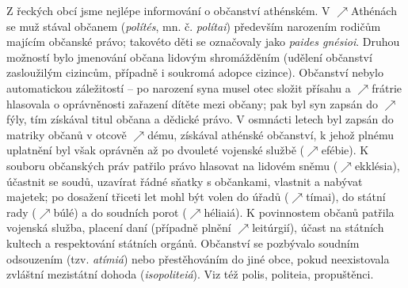 \documentclass{article}
\begin{document}
  Z řeckých obcí jsme nejlépe informování o občanství athénském. V $\nearrow$Athénách se muž stával občanem ({\it polítés}, mn. č. {\it polítai}) především narozením rodičům majícím občanské právo; takovéto děti se označovaly jako {\it paides gnésioi}. Druhou možností bylo jmenování občana lidovým shromážděním (udělení občanství zasloužilým cizincům, případně i soukromá adopce cizince). Občanství nebylo automatickou záležitostí -- po narození syna musel otec složit přísahu a $\nearrow$frátrie hlasovala o oprávněnosti zařazení dítěte mezi občany; pak byl syn zapsán do $\nearrow$fýly, tím získával titul občana a dědické právo. V osmnácti letech byl zapsán do matriky občanů v otcově $\nearrow$dému, získával athénské občanství, k jehož plnému uplatnění byl však oprávněn až po dvouleté vojenské službě ($\nearrow$efébie). K souboru občanských práv patřilo právo hlasovat na lidovém sněmu ($\nearrow$ekklésia), účastnit se soudů, uzavírat řádné sňatky s občankami, vlastnit a nabývat majetek; po dosažení třiceti let mohl být volen do úřadů ($\nearrow$tímai), do státní rady ($\nearrow$búlé) a do soudních porot ($\nearrow$héliaiá). K povinnostem  občanů patřila vojenská služba, placení daní (případně plnění $\nearrow$leitúrgií), účast na státních kultech a respektování státních orgánů. Občanství se pozbývalo soudním odsouzením (tzv. {\it atímiá}) nebo přestěhováním do jiné obce, pokud neexistovala zvláštní mezistátní dohoda ({\it isopoliteiá}). Viz též polis, politeia, propuštěnci.
\end{document}
